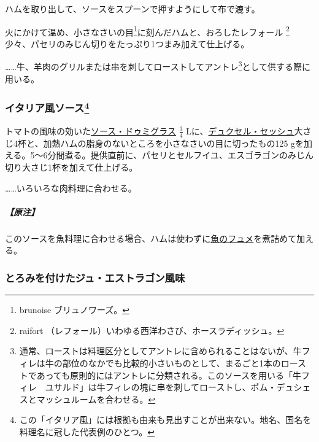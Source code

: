 \begin{recette}
ハムを取り出して、ソースをスプーンで押すようにして布で漉す。

火にかけて温め、小さなさいの目\footnote{brunoise ブリュノワーズ。}に刻んだハムと、おろしたレフォール
\footnote{raifort （レフォール）いわゆる西洋わさび、ホースラディッシュ。}少々、パセリのみじん切りをたっぷり1つまみ加えて仕上げる。

\ldots{}\ldots{}牛、羊肉のグリルまたは串を刺してローストしてアントレ\footnote{通常、ローストは料理区分としてアントレに含められることはないが、牛フィレは牛の部位のなかでも比較的小さいものとして、まるごと1本のローストであっても原則的にはアントレに分類される。このソースを用いる「牛フィレ　ユサルド」は牛フィレの塊に串を刺してローストし、ポム・デュシェスとマッシュルームを合わせる。}として供する際に用いる。

\atoaki{}

\hypertarget{sauce-italienne}{%
\subsubsection[イタリア風ソース]{\texorpdfstring{イタリア風ソース\footnote{この「イタリア風」には根拠も由来も見出すことが出来ない。地名、国名を料理名に冠した代表例のひとつ。}}{イタリア風ソース}}\label{sauce-italienne}}


 

トマトの風味の効いた\protect\hyperlink{sauce-demi-glace}{ソース・ドゥミグラス}
\(\frac{3}{4}\)
Lに、\protect\hyperlink{duxelles-seche}{デュクセル・セッシュ}大さじ4杯と、加熱ハムの脂身のないところを小さなさいの目に切ったもの125
gを加える。5〜6分間煮る。提供直前に、パセリとセルフイユ、エスゴラゴンのみじん切り大さじ1杯を加えて仕上げる。

\ldots{}\ldots{}いろいろな肉料理に合わせる。

\hypertarget{nota-sauce-italienne}{%
\subparagraph{【原注】}\label{nota-sauce-italienne}}

このソースを魚料理に合わせる場合、ハムは使わずに\protect\hyperlink{fumet-de-poisson}{魚のフュメ}を煮詰めて加える。

\atoaki{}

\hypertarget{jus-lie-a-lestragon}{%
\subsubsection{とろみを付けたジュ・エストラゴン風味}\label{jus-lie-a-lestragon}}


\end{recette}
